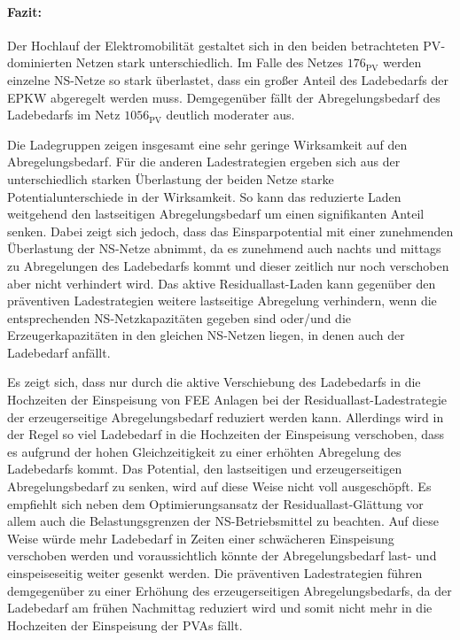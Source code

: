 \paragraph{Fazit:}

Der Hochlauf der Elektromobilität gestaltet sich in den beiden betrachteten \gls{PV}-dominierten Netzen stark unterschiedlich.
Im Falle des Netzes \(176_{\text{PV}}\) werden einzelne \gls{NS}-Netze so stark überlastet, dass ein großer Anteil des Ladebedarfs der \gls{EPKW} abgeregelt werden muss.
Demgegenüber fällt der Abregelungsbedarf des Ladebedarfs im Netz \(1056_{\text{PV}}\) deutlich moderater aus. \medskip

Die Ladegruppen zeigen insgesamt eine sehr geringe Wirksamkeit auf den Abregelungsbedarf.
Für die anderen Ladestrategien ergeben sich aus der unterschiedlich starken Überlastung der beiden Netze starke Potentialunterschiede in der Wirksamkeit.
So kann das reduzierte Laden weitgehend den lastseitigen Abregelungsbedarf um einen signifikanten Anteil senken.
Dabei zeigt sich jedoch, dass das Einsparpotential mit einer zunehmenden Überlastung der \gls{NS}-Netze abnimmt, da es zunehmend auch nachts und mittags zu Abregelungen des Ladebedarfs kommt und dieser zeitlich nur noch verschoben aber nicht verhindert wird.
Das aktive Residuallast-Laden kann gegenüber den präventiven Ladestrategien weitere lastseitige Abregelung verhindern, wenn die entsprechenden \gls{NS}-Netzkapazitäten gegeben sind oder/und die Erzeugerkapazitäten in den gleichen \gls{NS}-Netzen liegen, in denen auch der Ladebedarf anfällt.\medskip

Es zeigt sich, dass nur durch die aktive Verschiebung des Ladebedarfs in die Hochzeiten der Einspeisung von \gls{FEE} Anlagen bei der Residuallast-Ladestrategie der erzeugerseitige Abregelungsbedarf reduziert werden kann.
Allerdings wird in der Regel so viel Ladebedarf in die Hochzeiten der Einspeisung verschoben, dass es aufgrund der hohen Gleichzeitigkeit zu einer erhöhten Abregelung des Ladebedarfs kommt.
Das Potential, den lastseitigen und erzeugerseitigen Abregelungsbedarf zu senken, wird auf diese Weise nicht voll ausgeschöpft.
Es empfiehlt sich neben dem Optimierungsansatz der Residuallast-Glättung vor allem auch die Belastungsgrenzen der \gls{NS}-Betriebsmittel zu beachten.
Auf diese Weise würde mehr Ladebedarf in Zeiten einer schwächeren Einspeisung verschoben werden und voraussichtlich könnte der Abregelungsbedarf last- und einspeiseseitig weiter gesenkt werden.
Die präventiven Ladestrategien führen demgegenüber zu einer Erhöhung des erzeugerseitigen Abregelungsbedarfs, da der Ladebedarf am frühen Nachmittag reduziert wird und somit nicht mehr in die Hochzeiten der Einspeisung der \glspl{PVA} fällt.


